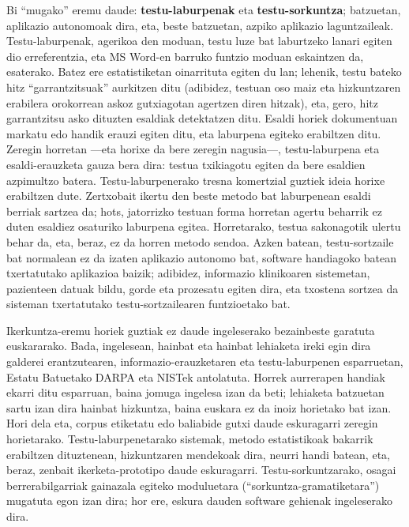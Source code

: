 \begin{multicols}{2}
Bi “mugako” eremu daude: \textbf{testu-labur\-pe\-nak} eta \textbf{testu-sorkuntza}; batzuetan, aplikazio autonomoak dira, eta, beste batzuetan, azpiko aplikazio laguntzaileak. Testu-laburpenak, agerikoa den moduan, testu luze bat laburtzeko lanari egiten dio erreferentzia, eta MS Word-en barruko funtzio moduan eskaintzen da, esaterako. Batez ere estatistiketan oinarrituta egiten du lan; lehenik, testu bateko hitz “garrantzitsuak” aurkitzen ditu (adibidez, testuan oso maiz eta hizkuntzaren erabilera orokorrean askoz gutxiagotan agertzen diren hitzak), eta, gero, hitz garrantzitsu asko dituzten esaldiak detektatzen ditu. Esaldi horiek dokumentuan markatu edo handik erauzi egiten ditu, eta laburpena egiteko erabiltzen ditu. Zeregin horretan —eta horixe da bere zeregin nagusia—, testu-laburpena eta esaldi-erauzketa gauza bera dira: testua txikiagotu egiten da bere esaldien azpimultzo batera. Testu-laburpenerako tresna komertzial guztiek ideia horixe erabiltzen dute. Zertxobait ikertu den beste metodo bat laburpenean esaldi berriak sartzea da; hots, jatorrizko testuan forma horretan agertu beharrik ez duten esaldiez osaturiko laburpena egitea. Horretarako, testua sakonagotik ulertu behar da, eta, beraz, ez da horren metodo sendoa. Azken batean, testu-sortzaile bat normalean ez da izaten aplikazio autonomo bat, software handiagoko batean txertatutako aplikazioa baizik; adibidez, informazio klinikoaren sistemetan, pazienteen datuak bildu, gorde eta prozesatu egiten dira, eta txostena sortzea da sisteman txertatutako testu-sortzailearen funtzioetako bat. 


Ikerkuntza-eremu horiek guztiak ez daude ingeleserako bezainbeste garatuta euskararako. Bada, ingelesean, hainbat eta hainbat lehiaketa ireki egin dira galderei erantzutearen, informazio-erauzketaren eta testu-laburpenen esparruetan, Estatu Batuetako DARPA eta NISTek antolatuta. Horrek aurrerapen handiak ekarri ditu esparruan, baina jomuga ingelesa izan da beti; lehiaketa batzuetan sartu izan dira hainbat hizkuntza, baina euskara ez da inoiz horietako bat izan. Hori dela eta, corpus etiketatu edo baliabide gutxi daude eskuragarri zeregin horietarako. Testu-laburpenetarako sistemak, metodo estatistikoak bakarrik erabiltzen dituztenean, hizkuntzaren mendekoak dira, neurri handi batean, eta, beraz, zenbait ikerketa-prototipo daude eskuragarri. Testu-sorkuntzarako, osagai berrerabilgarriak gainazala egiteko moduluetara (“sorkuntza-gramatiketara”) mugatuta egon izan dira; hor ere, eskura dauden software gehienak ingeleserako dira. 


\end{multicols}
